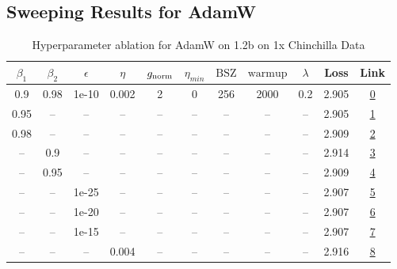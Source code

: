 \subsection{Sweeping Results for AdamW}%
\begin{table}[H]
\centering
\caption{Hyperparameter ablation for AdamW on 1.2b on 1x Chinchilla Data}
\label{tab:ablation_adamw_1.2b_on_1x_chinchilla_data}
\begin{tabular}{ccccccccccc}
\toprule
$\beta_1$ & $\beta_2$ & $\epsilon$ & $\eta$ & $g_{\mathrm{norm}}$ & $\eta_{min}$ & $\mathrm{BSZ}$ & $\mathrm{warmup}$ & $\lambda$ & Loss & Link \\
\midrule
0.9 & 0.98 & 1e-10 & 0.002 & 2 & 0 & 256 & 2000 & 0.2 & 2.905 & \href{https://wandb.ai/marin-community/optimizer-scaling/runs/sweep-1.2b-24B-adamwf115b7lr0.002-wd0.2-minlr0-warmup2000-b10.9--387e9f}{0} \\
\midrule
0.95 & -- & -- & -- & -- & -- & -- & -- & -- & 2.905 & \href{https://wandb.ai/marin-community/optimizer-scaling/runs/sweep-1.2b-24B-adamwf17f49lr0.002-wd0.2-minlr0-warmup2000-b10.95-444ce8}{1} \\
0.98 & -- & -- & -- & -- & -- & -- & -- & -- & 2.909 & \href{https://wandb.ai/marin-community/optimizer-scaling/runs/sweep-1.2b-24B-adamwcce254flr0.002-wd0.2-minlr0-warmup2000-b10.9-744305}{2} \\
-- & 0.9 & -- & -- & -- & -- & -- & -- & -- & 2.914 & \href{https://wandb.ai/marin-community/optimizer-scaling/runs/sweep-1.2b-24B-adamwf7d5fdlr0.002-wd0.2-minlr0-warmup2000-b10.9--2217ed}{3} \\
-- & 0.95 & -- & -- & -- & -- & -- & -- & -- & 2.909 & \href{https://wandb.ai/marin-community/optimizer-scaling/runs/sweep-1.2b-24B-adamwa250dblr0.002-wd0.2-minlr0-warmup2000-b10.9--91a988}{4} \\
-- & -- & 1e-25 & -- & -- & -- & -- & -- & -- & 2.907 & \href{https://wandb.ai/marin-community/optimizer-scaling/runs/sweep-1.2b-24B-adamwfb226elr0.002-wd0.2-minlr0-warmup2000-b10.9--56cdf6}{5} \\
-- & -- & 1e-20 & -- & -- & -- & -- & -- & -- & 2.907 & \href{https://wandb.ai/marin-community/optimizer-scaling/runs/sweep-1.2b-24B-adamw269849lr0.002-wd0.2-minlr0-warmup2000-b10.9--f1a022}{6} \\
-- & -- & 1e-15 & -- & -- & -- & -- & -- & -- & 2.907 & \href{https://wandb.ai/marin-community/optimizer-scaling/runs/sweep-1.2b-24B-adamwb9e3belr0.002-wd0.2-minlr0-warmup2000-b10.9--3d8fda}{7} \\
-- & -- & -- & 0.004 & -- & -- & -- & -- & -- & 2.916 & \href{https://wandb.ai/marin-community/optimizer-scaling/runs/sweep-1.2b-24B-adamw1edd23lr0.004-wd0.2-minlr0.0-warmup2000-b10.-92a750}{8} \\

\end{tabular}
\end{table}
